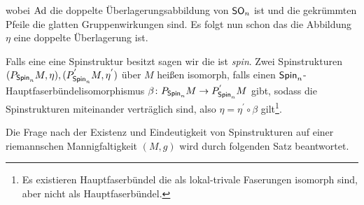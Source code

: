 \begin{Def}[Spinstruktur]
\begin{itemize}
                         wobei $\operatorname{Ad}$ die doppelte
                         Überlagerungsabbildung von $\operatorname{\mathsf{SO}}_n$ ist und
                        die gekrümmten Pfeile die glatten Gruppenwirkungen sind.
                         Es folgt nun schon das die Abbildung $\eta$   eine doppelte Überlagerung ist.
	 \end{itemize}
	 Falls eine \RMF eine Spinstruktur besitzt sagen wir die \mfg
         ist \textit{spin}.
     Zwei Spinstrukturen $ (P_{\operatorname{\mathsf{Spin}}_n}M,\eta),(P_{\operatorname{\mathsf{Spin}}_n}^{'}M,\eta^{'}) $ über $ M $ heißen isomorph, falls einen $ \operatorname{\mathsf{Spin}}_n $-Hauptfaserbündelisomorphismus $ \beta \colon P_{\operatorname{\mathsf{Spin}}_n}M \rightarrow P_{\operatorname{\mathsf{Spin}}_n}^{'}M $ gibt, sodass die
     Spinstrukturen miteinander verträglich sind, also $ \eta=\eta^{'} \circ \beta $ gilt\footnote{Es existieren Hauptfaserbündel die als lokal-trivale Faserungen isomorph sind, aber nicht als Hauptfaserbündel.}.
\end{Def}

Die Frage nach der Existenz und Eindeutigkeit von Spinstrukturen 
auf einer riemannschen Mannigfaltigkeit $ (M,g) $ wird durch folgenden
Satz beantwortet.

